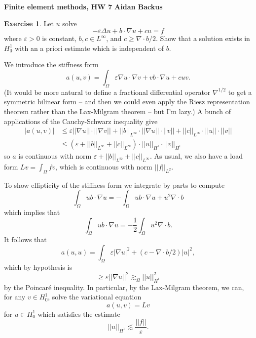 \documentclass[10pt]{article}
\theoremstyle{definition}
\newtheorem{exer}{Exercise}
\begin{document}
\noindent
\large\textbf{Finite element methods, HW 7} \hfill \textbf{Aidan Backus} \\

\begin{exer}
Let $u$ solve
$$-\varepsilon \Delta u + b \cdot \nabla u + cu = f$$
where $\varepsilon > 0$ is constant, $b,c \in L^\infty$, and $c \geq \nabla \cdot b/2$.
Show that a solution exists in $H^1_0$ with an a priori estimate which is independent of $b$.
\end{exer}

We introduce the stiffness form
$$a(u, v) = \int_\Omega \varepsilon \nabla u \cdot \nabla v + vb\cdot \nabla u + cuv.$$
(It would be more natural to define a fractional differential operator $\nabla^{1/2}$ to get a symmetric bilinear form -- and then we could even apply the Riesz representation theorem rather than the Lax-Milgram theorem -- but I'm lazy.)
A bunch of applications of the Cauchy-Schwarz inequality give
\begin{align*}
|a(u, v)| &\leq \varepsilon ||\nabla u|| \cdot ||\nabla v|| + ||b||_{L^\infty} \cdot ||\nabla u|| \cdot ||v|| + ||c||_{L^\infty} \cdot ||u|| \cdot ||v||\\
&\leq (\varepsilon + ||b||_{L^\infty} + ||c||_{L^\infty}) \cdot ||u||_{H^1} \cdot ||v||_{H^1}
\end{align*}
so $a$ is continuous with norm $\varepsilon + ||b||_{L^\infty} + ||c||_{L^\infty}$.
As usual, we also have a load form $Lv = \int_\Omega fv$, which is continuous with norm $||f||_{L^2}$.

To show ellipticity of the stiffness form we integrate by parts to compute
$$\int_\Omega ub \cdot \nabla u = -\int_\Omega ub \cdot \nabla u + u^2 \nabla \cdot b$$
which implies that
$$\int_\Omega ub \cdot \nabla u = -\frac{1}{2} \int_\Omega u^2 \nabla \cdot b.$$
It follows that
$$a(u, u) = \int_\Omega \varepsilon |\nabla u|^2 + (c - \nabla \cdot b/2)|u|^2,$$
which by hypothesis is
$$\geq \varepsilon ||\nabla u||^2 \gtrsim_\Omega ||u||_{H^1}^2$$
by the Poincar\'e inequality. In particular, by the Lax-Milgram theorem, we can, for any $v \in H^1_0$, solve the variational equation
$$a(u, v) = Lv$$
for $u \in H^1_0$ which satisfies the estimate
$$||u||_{H^1} \lesssim \frac{||f||}{\varepsilon}.$$
\end{document}
